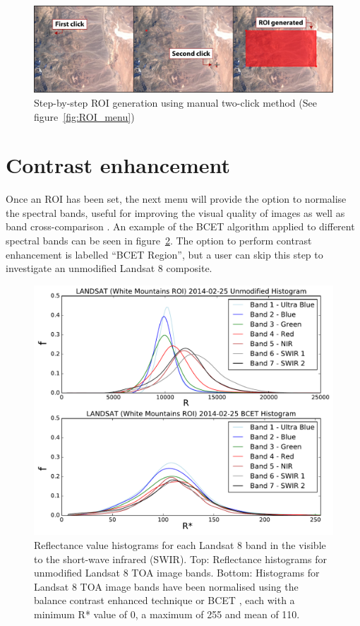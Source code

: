 \documentclass[12pt]{article}
\begin{document}
\begin{figure}[htbp]
\centering
\includegraphics[width=1.0\textwidth]{images/roi_steps_reduced.jpg}
\caption{Step-by-step ROI generation using manual two-click method (See figure~\ref{fig:ROI_menu})}
\label{fig:roi_steps}
\end{figure}


\section{Contrast enhancement}
\label{sec:BCET}

Once an ROI has been set, the next menu will provide the option to normalise the spectral bands, useful for improving the visual quality of images as well as band cross-comparison \citep{guo1991,LiuMason2009}. An example of the BCET algorithm applied to different spectral bands can be seen in figure~\ref{fig:histograms}. The option to perform contrast enhancement is labelled ``BCET Region'', but a user can skip this step to investigate an unmodified Landsat 8 composite.

\begin{figure}[htbp]
\centering
\includegraphics[width=1.0\textwidth]{images/histograms.pdf}
\caption{Reflectance value histograms for each Landsat 8 band in the visible to the short-wave infrared (SWIR). Top: Reflectance histograms for unmodified Landsat 8 TOA image bands. Bottom: Histograms for Landsat 8 TOA image bands have been normalised using the balance contrast enhanced technique or BCET \citep{guo1991}, each with a minimum R* value of 0, a maximum of 255 and mean of 110.}
\label{fig:histograms}
\end{figure}
\end{document}
